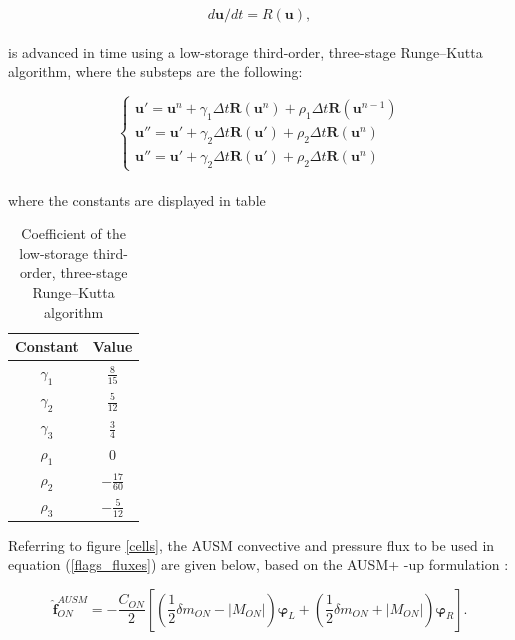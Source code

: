 \documentclass[a5paper]{sapthesis}
\begin{document}
	\begin{equation}
		d \mathbf{u}/dt = R(\mathbf{u}),
	\end{equation}
	\\
	is advanced in time using a low-storage	third-order, three-stage Runge–Kutta algorithm, where the substeps are the following:
	
	\begin{equation}
		\begin{cases}
			\mathbf{u}' = \mathbf{u}^n + \gamma_1 \Delta t\mathbf{R}(\mathbf{u}^n) + \rho_1 \Delta t\mathbf{R}(\mathbf{u}^{n-1})\\
			\mathbf{u}'' = \mathbf{u}' + \gamma_2 \Delta t\mathbf{R}(\mathbf{u}') + \rho_2 \Delta t\mathbf{R}(\mathbf{u}^n)\\
			\mathbf{u}'' = \mathbf{u}' + \gamma_2 \Delta t\mathbf{R}(\mathbf{u}') + \rho_2 \Delta t\mathbf{R}(\mathbf{u}^n)
		\end{cases}	
	\end{equation}
	\\
	where the constants are displayed in table 
	
	\begin{table}[h]
		\centering
		\renewcommand{\arraystretch}{1.6} %
		\begin{tabular}{c c}
			\hline
			\textbf{Constant} & \textbf{Value} \\ 
			\hline 
			$\gamma_1$  & $\frac{8}{15}$ \\
			$\gamma_2$  & $\frac{5}{12}$ \\
			$\gamma_3$  & $\frac{3}{4}$ \\
			$\rho_1$    & $0$ \\
			$\rho_2$    & $-\frac{17}{60}$ \\
			$\rho_3$    & $-\frac{5}{12}$ \\  
			\hline
		\end{tabular}
		\vspace{3mm}
		\caption{Coefficient of the low-storage	third-order, three-stage Runge–Kutta algorithm}
		\label{table:RKconstants}
	\end{table}
	
	\noindent Referring to figure \ref{cells}, the AUSM convective and pressure ﬂux to be
	used in equation (\ref{flags_fluxes}) are given below, based on the AUSM+ -up formulation \citep{LIOU_AUSM+-up}:
	
	\begin{equation}
		\mathbf{\hat{f}}_{ON}^{AUSM} = -\frac{C_{ON}}{2} \left[ \left( \frac{1}{2} \delta m_{ON} - |M_{ON}| \right) \mathbf{\varphi}_L + \left( \frac{1}{2} \delta m_{ON} + |M_{ON}| \right) \mathbf{\varphi}_R \right].
	\end{equation}
	
\end{document}
